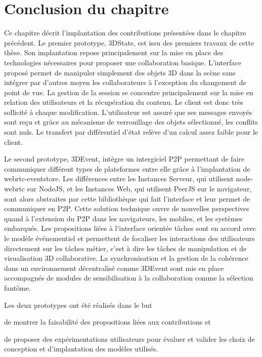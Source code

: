 \section{Conclusion du chapitre}

Ce chapitre décrit l'implantation des contributions présentées dans le chapitre 
précédent.
Le premier prototype, 3DState, est issu des premiers travaux de cette thèse. Son 
implantation repose principalement sur la mise en place des technologies 
nécessaires pour proposer une collaboration basique. L'interface proposé permet 
de  manipuler simplement des objets 3D dans la scène sans intégrer par d'autres 
moyen les collaborateurs à l'exception du changement de point de vue. La gestion 
de la session se concentre principalement sur la mise en relation des utilisateurs 
et la récupération du contenu. Le client est donc très sollicité à chaque 
modification. L'utilisateur est assuré que ses messages envoyés sont reçu et 
grâce au mécanisme de verrouillage des objets sélectionné, les conflits sont nuls. 
Le transfert par différentiel d'état relève d'un calcul assez faible pour le client.

Le second prototype, 3DEvent, intègre un intergiciel \gls{P2P} permettant de faire 
communiquer différent types de plateformes entre elle grâce à l'implantation de 
webrtc-eventstore. Les différences entre les Instances Serveur, qui utilisent  
node-webrtc sur NodeJS, et les Instances Web, qui utilisent PeerJS sur le 
navigateur, sont alors abstraites par cette bibliothèque qui fait l'interface et leur 
permet de communiquer en \gls{P2P}. Cette solution technique ouvre de nouvelles 
perspectives quand à l'extension du \gls{P2P} dans les navigateurs, les mobiles, 
et les systèmes embarqués. Les propositions liées à l'interface orientée tâches 
sont en accord avec le modèle événementiel et permettent de focaliser les 
interactions des utilisateurs directement sur les tâches métier, c'est à dire les 
tâches de manipulation et de visualisation 3D collaborative. La synchronisation et 
la gestion de la cohérence dans un environnement décentralisé comme 3DEvent 
sont mis en place accompagnés de modules de sensibilisation à la collaboration 
comme la sélection fantôme.

Les deux prototypes ont été réalisés dans le but 
\begin{enumerate*}[label=(\roman*)]
	\item de montrer la faisabilité des 
	propositions liées aux contributions et
	\item de proposer des expérimentations 
	utilisateurs pour évaluer et valider les choix de conception et d'implantation des 
	modèles utilisés.
\end{enumerate*}
